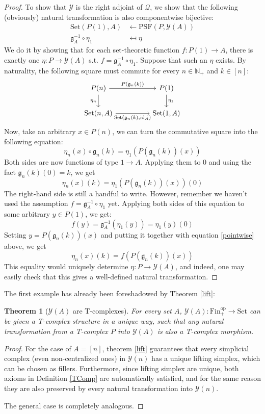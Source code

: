 \documentclass{article}
\newtheorem{theorem}{Theorem}[subsection]
\theoremstyle{remark}
\theoremstyle{definition}
\newcommand{\N}{\mathbb N}
\newcommand{\Fin}{\mathrm{Fin}}
\newcommand{\Set}{\mathrm{Set}}
\newcommand{\PSF}{\mathrm{PSF}}
\newcommand{\op}{\mathrm{op}}
\newcommand{\id}{\mathrm{id}}
\newcommand{\Y}{\mathcal Y}
\newcommand{\g}{\mathfrak g}
\newcommand{\Q}{\mathcal Q}
\begin{document}
\begin{proof}
		To show that $\Y$ is the right adjoint of $\Q$, we show that the following (obviously) natural transformation is also componentwise bijective:
		\begin{align*}
			\Set(P(1),A)&\gets\PSF(P,\Y(A))\\
			\g_A^{-1}\circ\eta_1&\mapsfrom\eta
		\end{align*}
		We do it by showing that for each set-theoretic function $f:P(1)\to A$, there is exactly one $\eta:P\to\Y(A)$ s.t. $f=\g_A^{-1}\circ\eta_1$. Suppose that such an $\eta$ exists. By naturality, the following square must commute for every $n\in\N_+$ and $k\in[n]$:
		\[\begin{tikzcd}
			P(n)\arrow{rr}{P(\g_n(k))}\arrow{d}[swap]{\eta_n}&&P(1)\arrow{d}{\eta_1}\\
			\Set(n,A)\arrow{rr}[swap]{\Set(\g_n(k),\id_A)}&&\Set(1,A)
		\end{tikzcd}\]
		Now, take an arbitrary $x\in P(n)$, we can turn the commutative square into the following equation:
		\[\eta_n(x)\circ\g_n(k)=\eta_1(P(\g_n(k))(x))\]
		Both sides are now functions of type $1\to A$. Applying them to 0 and using the fact $\g_n(k)(0)=k$, we get
		\begin{equation}\label{pointwise}
			\eta_n(x)(k)=\eta_1(P(\g_n(k))(x))(0)
		\end{equation}
		The right-hand side is still a handful to write. However, remember we haven't used the assumption $f=\g_A^{-1}\circ\eta_1$ yet. Applying both sides of this equation to some arbitrary $y\in P(1)$, we get:
		\[f(y)=\g_A^{-1}(\eta_1(y))=\eta_1(y)(0)\]
		Setting $y=P(\g_n(k))(x)$ and putting it together with equation \ref{pointwise} above, we get
		\[\eta_n(x)(k)=f(P(\g_n(k))(x))\]
		This equality would uniquely determine $\eta:P\to\Y(A)$, and indeed, one may easily check that this gives a well-defined natural transformation.
	\end{proof}
	The first example has already been foreshadowed by Theorem \ref{lift}:
	\begin{theorem}[$\Y(A)$ are T-complexes]\label{YTComp}
		For every set $A$, $\Y(A):\Fin_+^\op\to\Set$ can be given a T-complex structure in a unique way, such that any natural transformation from a T-complex $P$ into $\Y(A)$ is also a T-complex morphism.
	\end{theorem}
	\begin{proof}
		For the case of $A=[n]$, theorem \ref{lift} guarantees that every simplicial complex (even non-centralized ones) in $\Y(n)$ has a unique lifting simplex, which can be chosen as fillers. Furthermore, since lifting simplex are unique, both axioms in Definition \ref{TComp} are automatically satisfied, and for the same reason they are also preserved by every natural transformation into $\Y(n)$.
		
		The general case is completely analogous.
	\end{proof}
\end{document}
